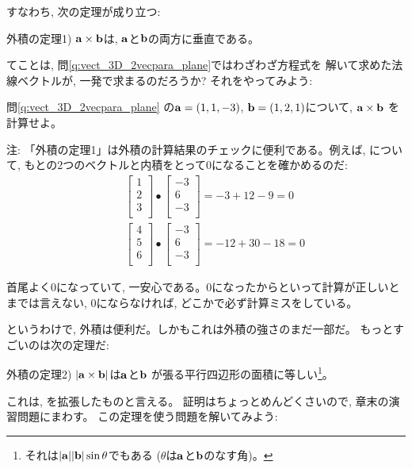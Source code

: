 すなわち, 次の定理が成り立つ:\hv

外積の定理1) ${\bf a}\times{\bf b}$は, ${\bf a}$と${\bf b}$の両方に垂直である。\hv

てことは, 問\ref{q:vect_3D_2vecpara_plane}ではわざわざ方程式を
解いて求めた法線ベクトルが, 一発で求まるのだろうか? それをやってみよう:

\begin{q}\label{q:vect_3D_2vecpara_plane2} 問\ref{q:vect_3D_2vecpara_plane}
の${\bf a}=(1, 1, -3)$, ${\bf b}=(1, 2, 1)$について, ${\bf a}\times{\bf b}$
を計算せよ。\end{q}\hv

注: 「外積の定理1」は外積の計算結果のチェックに便利である。例えば, 
について, 
もとの2つのベクトルと内積をとって0になることを確かめるのだ:
\begin{eqnarray*}
&&\begin{bmatrix}1\\
2\\
3\\
\end{bmatrix}\bullet
\begin{bmatrix}-3\\
6\\
-3\\
\end{bmatrix}=-3+12-9=0\\
&&\begin{bmatrix}4\\
5\\
6\\
\end{bmatrix}\bullet
\begin{bmatrix}-3\\
6\\
-3\\
\end{bmatrix}=-12+30-18=0
\end{eqnarray*}

首尾よく0になっていて, 一安心である。0になったからといって計算が正しいとまでは言えない, 
0にならなければ, どこかで必ず計算ミスをしている。\hv

というわけで, 外積は便利だ。しかもこれは外積の強さのまだ一部だ。
もっとすごいのは次の定理だ:\hv

外積の定理2) $|{\bf a}\times{\bf b}|$は${\bf a}$と${\bf b}$
が張る平行四辺形の面積に等しい\footnote{それは$|{\bf a}||{\bf b}|\sin\theta$でもある
($\theta$は${\bf a}$と${\bf b}$のなす角)。}。\hv

これは, を拡張したものと言える。
証明はちょっとめんどくさいので, 章末の演習問題にまわす。
この定理を使う問題を解いてみよう:\hv

